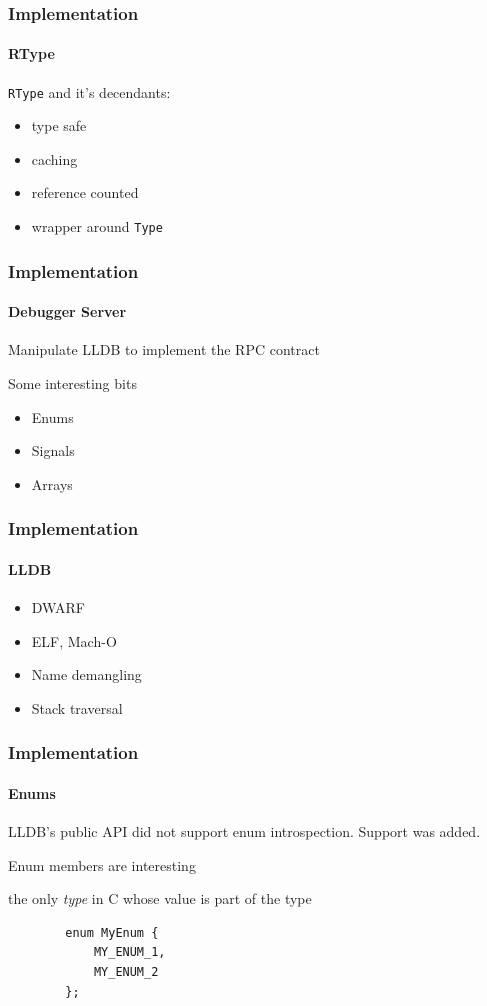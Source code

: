 \documentclass{beamer}
\begin{document}
\begin{frame}
	\frametitle{Implementation}
	\framesubtitle{RType}
	\lstinline|RType| and it's decendants:

	\begin{itemize}
		\item type safe
		\item caching
		\item reference counted
		\item wrapper around \lstinline|Type|
	\end{itemize}
\end{frame}

\begin{frame}
	\frametitle{Implementation}
	\framesubtitle{Debugger Server}

	Manipulate LLDB to implement the RPC contract

	\pause

	Some interesting bits
	\begin{itemize}
		\item Enums
		\item Signals
		\item Arrays
	\end{itemize}
\end{frame}

\begin{frame}
	\frametitle{Implementation}
	\framesubtitle{LLDB}

	\begin{itemize}
		\item DWARF
		\item ELF, Mach-O
		\item Name demangling
		\item Stack traversal
	\end{itemize}
\end{frame}

\begin{frame}[fragile]
	\frametitle{Implementation}
	\framesubtitle{Enums}

	LLDB's public API did not support enum introspection. Support was added.

	\pause

	Enum members are interesting

	\pause

	the only \emph{type} in C whose value is part of the type

	\begin{verbatim}
		enum MyEnum {
		    MY_ENUM_1,
		    MY_ENUM_2
		};
	\end{verbatim}
\end{frame}
\end{document}
